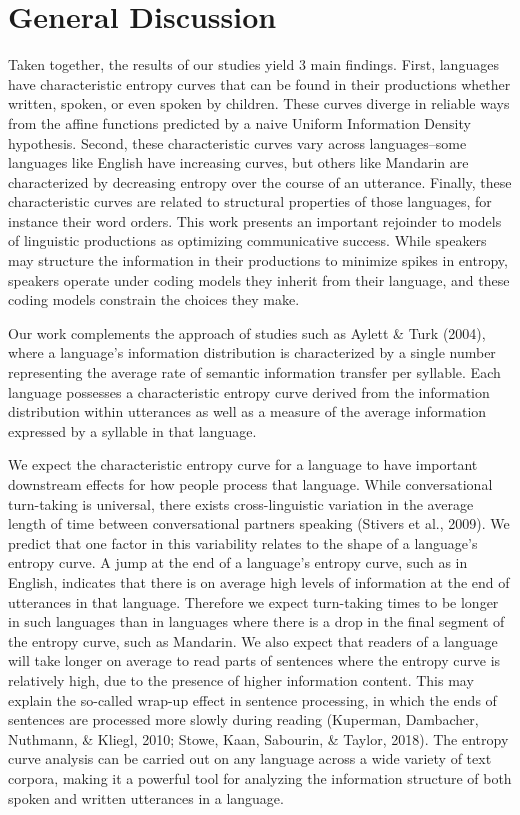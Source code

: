 \documentclass[10pt, letterpaper]{article}
\begin{document}
\hypertarget{general-discussion}{%
\section{General Discussion}\label{general-discussion}}

Taken together, the results of our studies yield 3 main findings. First,
languages have characteristic entropy curves that can be found in their
productions whether written, spoken, or even spoken by children. These
curves diverge in reliable ways from the affine functions predicted by a
naive Uniform Information Density hypothesis. Second, these
characteristic curves vary across languages--some languages like English
have increasing curves, but others like Mandarin are characterized by
decreasing entropy over the course of an utterance. Finally, these
characteristic curves are related to structural properties of those
languages, for instance their word orders. This work presents an
important rejoinder to models of linguistic productions as optimizing
communicative success. While speakers may structure the information in
their productions to minimize spikes in entropy, speakers operate under
coding models they inherit from their language, and these coding models
constrain the choices they make.

Our work complements the approach of studies such as Aylett \& Turk
(2004), where a language's information distribution is characterized by
a single number representing the average rate of semantic information
transfer per syllable. Each language possesses a characteristic entropy
curve derived from the information distribution within utterances as
well as a measure of the average information expressed by a syllable in
that language.

We expect the characteristic entropy curve for a language to have
important downstream effects for how people process that language. While
conversational turn-taking is universal, there exists cross-linguistic
variation in the average length of time between conversational partners
speaking (Stivers et al., 2009). We predict that one factor in this
variability relates to the shape of a language's entropy curve. A jump
at the end of a language's entropy curve, such as in English, indicates
that there is on average high levels of information at the end of
utterances in that language. Therefore we expect turn-taking times to be
longer in such languages than in languages where there is a drop in the
final segment of the entropy curve, such as Mandarin. We also expect
that readers of a language will take longer on average to read parts of
sentences where the entropy curve is relatively high, due to the
presence of higher information content. This may explain the so-called
wrap-up effect in sentence processing, in which the ends of sentences
are processed more slowly during reading (Kuperman, Dambacher, Nuthmann,
\& Kliegl, 2010; Stowe, Kaan, Sabourin, \& Taylor, 2018). The entropy
curve analysis can be carried out on any language across a wide variety
of text corpora, making it a powerful tool for analyzing the information
structure of both spoken and written utterances in a language.
\end{document}
